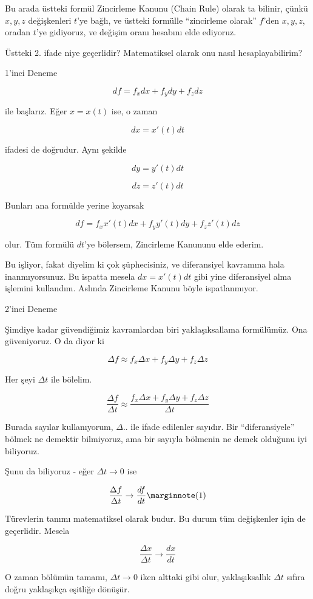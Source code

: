 \documentclass[12pt,fleqn]{article}\usepackage{../../common}
\begin{document}
Bu arada üstteki formül Zincirleme Kanunu (Chain Rule) olarak ta bilinir,
çünkü $x,y,z$ değişkenleri $t$'ye bağlı, ve üstteki formülle ``zincirleme
olarak'' $f$'den $x,y,z$, oradan $t$'ye gidiyoruz, ve değişim oranı
hesabını elde ediyoruz.

Üstteki 2. ifade niye geçerlidir? Matematiksel olarak onu nasıl
hesaplayabilirim? 

1'inci Deneme

$$ df = f_xdx + f_ydy + f_zdz $$

ile başlarız. Eğer $x=x(t)$ ise, o zaman

$$ dx = x'(t)dt $$

ifadesi de doğrudur. Aynı şekilde

$$ dy = y'(t)dt $$

$$ dz = z'(t)dt $$

Bunları ana formülde yerine koyarsak

$$ df = f_xx'(t)dx + f_yy'(t)dy + f_zz'(t)dz $$

olur. Tüm formülü $dt$'ye bölersem, Zincirleme Kanununu elde ederim. 

Bu işliyor, fakat diyelim ki çok şüphecisiniz, ve diferansiyel kavramına
hala inanmıyorsunuz. Bu ispatta mesela $dx = x'(t)dt$ gibi yine
diferansiyel alma işlemini kullandım. Aslında Zincirleme Kanunu böyle
ispatlanmıyor. 

2'inci Deneme

Şimdiye kadar güvendiğimiz kavramlardan biri yaklaşıksallama
formülümüz. Ona güveniyoruz. O da diyor ki 

$$ \Delta f \approx f_x\Delta x + f_y \Delta y + f_z \Delta z $$

Her şeyi $\Delta t$ ile bölelim. 

$$ \frac{\Delta f}{\Delta t} \approx 
\frac{f_x\Delta x + f_y \Delta y + f_z \Delta z }{\Delta t}$$

Burada sayılar kullanıyorum, $\Delta ..$ ile ifade edilenler sayıdır. Bir
``diferansiyele'' bölmek ne demektir bilmiyoruz, ama bir sayıyla bölmenin ne
demek olduğunu iyi biliyoruz.

Şunu da biliyoruz - eğer $\Delta t \to 0$ ise 

$$
\frac{\Delta f}{\Delta t} \to \frac{df}{dt}
\mlabel{1}
$$

Türevlerin tanımı matematiksel olarak budur. Bu durum tüm değişkenler için
de geçerlidir. Mesela

$$ \frac{\Delta x}{\Delta t} \to \frac{dx}{dt} $$

O zaman bölümün tamamı, $\Delta t \to 0$ iken alttaki gibi olur,
yaklaşıksallık $\Delta t$ sıfıra doğru yaklaşıkça eşitliğe dönüşür.
\end{document}
